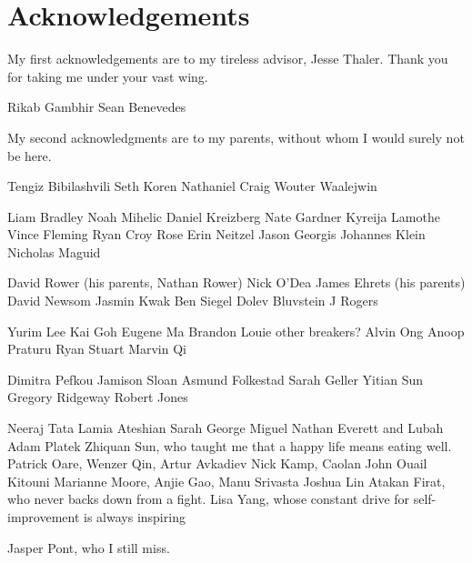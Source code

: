 \section*{Acknowledgements}


My first acknowledgements are to my tireless advisor, Jesse Thaler.
%
Thank you for taking me under your vast wing.

Rikab Gambhir
%
Sean Benevedes


My second acknowledgments are to my parents, without whom I would surely not be here.


Tengiz Bibilashvili
%
Seth Koren
%
Nathaniel Craig
%
Wouter Waalejwin


Liam Bradley
%
Noah Mihelic
%
Daniel Kreizberg
%
Nate Gardner
%
Kyreija Lamothe
%
Vince Fleming
%
Ryan Croy
%
Rose
%
Erin Neitzel
%
Jason Georgis
%
Johannes Klein
%
Nicholas Maguid


David Rower
(his parents, Nathan Rower)
%
Nick O'Dea
%
James Ehrets
(his parents)
%
David Newsom
%
Jasmin Kwak
%
Ben Siegel
%
Dolev Bluvstein
%
J Rogers


Yurim Lee
%
Kai Goh
%
Eugene Ma
%
Brandon Louie
%
other breakers?
%
Alvin Ong
%
Anoop Praturu
%
Ryan Stuart
%
Marvin Qi


Dimitra Pefkou
%
Jamison Sloan
%
Asmund Folkestad
%
Sarah Geller
%
Yitian Sun
%
Gregory Ridgeway
%
Robert Jones


Neeraj Tata
%
Lamia Ateshian
%
Sarah
%
George
%
Miguel
%
Nathan Everett and Lubah
%
Adam Platek
%
Zhiquan Sun, who taught me that a happy life means eating well.
%
Patrick Oare, Wenzer Qin, Artur Avkadiev
%
Nick Kamp, Caolan John
%
Ouail Kitouni
%
Marianne Moore, Anjie Gao, Manu Srivasta
%
Joshua Lin
%
Atakan Firat, who never backs down from a fight.
%
Lisa Yang, whose constant drive for self-improvement is always inspiring

Jasper Pont, who I still miss.
